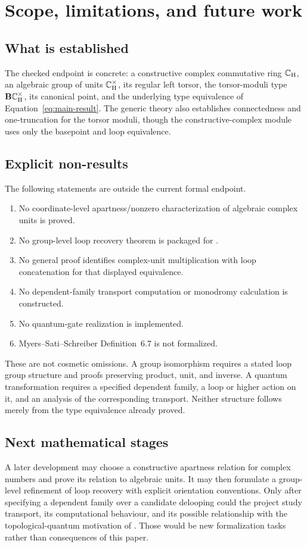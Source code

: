 \section{Scope, limitations, and future work}
\label{sec:scope}

\subsection{What is established}
The checked endpoint is concrete: a constructive complex commutative ring
$\mathbb{C}_{\mathrm H}$, an algebraic group of units $\mathbb{C}_{\mathrm H}^{\times}$, its regular left torsor, the
torsor-moduli type $\mathbf{B}\mathbb{C}_{\mathrm H}^{\times}$, its canonical point, and the underlying
type equivalence of Equation~\eqref{eq:main-result}.  The generic theory also
establishes connectedness and one-truncation for the torsor moduli, though the
constructive-complex module uses only the basepoint and loop equivalence.

\subsection{Explicit non-results}
The following statements are outside the current formal endpoint.
\begin{enumerate}[label=\arabic*.]
\item No coordinate-level apartness/nonzero characterization of algebraic
complex units is proved.
\item No group-level loop recovery theorem is packaged for
.
\item No general proof identifies complex-unit multiplication with loop
concatenation for that displayed equivalence.
\item No dependent-family transport computation or monodromy calculation is
constructed.
\item No quantum-gate realization is implemented.
\item Myers--Sati--Schreiber Definition~6.7 is not formalized.
\end{enumerate}

These are not cosmetic omissions.  A group isomorphism requires a stated loop
group structure and proofs preserving product, unit, and inverse.  A quantum
transformation requires a specified dependent family, a loop or higher action
on it, and an analysis of the corresponding transport.  Neither structure
follows merely from the type equivalence already proved.

\subsection{Next mathematical stages}
A later development may choose a constructive apartness relation for complex
numbers and prove its relation to algebraic units.  It may then formulate a
group-level refinement of loop recovery with explicit orientation conventions.
Only after specifying a dependent family over a candidate delooping could the
project study transport, its computational behaviour, and its possible
relationship with the topological-quantum motivation of \cite{mss}.  Those
would be new formalization tasks rather than consequences of this paper.

